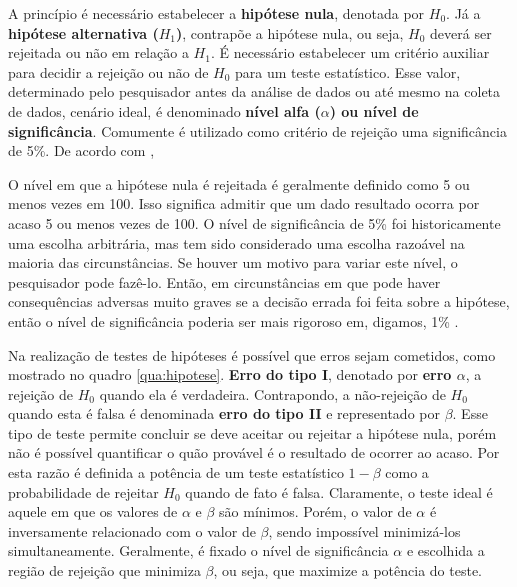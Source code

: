 A princípio é necessário estabelecer a \textbf{hipótese nula}, denotada por \textbf{$H_0$}. Já a \textbf{hipótese alternativa ($H_1$)}, contrapõe a hipótese nula, ou seja, $H_0$ deverá ser rejeitada ou não em relação a $H_1$. É necessário estabelecer um critério auxiliar para decidir a rejeição ou não de $H_0$ para um teste estatístico. Esse valor, determinado pelo pesquisador antes da análise de dados ou até mesmo na coleta de dados, cenário ideal, é denominado \textbf{nível alfa ($\alpha$) ou nível de significância}. Comumente é utilizado como critério de rejeição uma significância de 5\%. De acordo com , 

\begin{citacao}
O nível em que a hipótese nula é rejeitada é geralmente definido como 5 ou menos vezes em 100. Isso significa admitir que um dado resultado ocorra por acaso 5 ou menos vezes de 100.  O nível de significância de 5\% foi historicamente uma escolha arbitrária, mas tem sido considerado uma escolha razoável na maioria das circunstâncias. Se houver um motivo para variar este nível, o pesquisador pode  fazê-lo. Então, em circunstâncias em que pode haver consequências adversas muito graves se a decisão errada foi feita sobre a hipótese, então o nível de significância poderia ser mais rigoroso em, digamos, 1\% \cite[p.~151]{cramer2004sage}. 
\end{citacao}

Na realização de testes de hipóteses é possível que erros sejam cometidos, como mostrado no quadro \ref{qua:hipotese}. \textbf{Erro do tipo I}, denotado por \textbf{erro $\alpha$}, a rejeição de $H_0$ quando ela é verdadeira. Contrapondo, a não-rejeição de $H_0$ quando esta é falsa é denominada \textbf{erro do tipo II} e representado por \textbf{$\beta$}.  Esse tipo de teste permite concluir se deve aceitar ou rejeitar a hipótese nula, porém não é possível quantificar o quão provável é o resultado de ocorrer ao acaso. Por esta razão é definida a potência de um teste estatístico $1-\beta$ como a probabilidade de rejeitar $H_0$ quando de fato é falsa. Claramente, o teste ideal é aquele em que os valores de $\alpha$ e $\beta$ são mínimos. Porém, o valor de $\alpha$ é inversamente relacionado com o valor de $\beta$, sendo impossível minimizá-los simultaneamente. Geralmente, é fixado o nível de significância $\alpha$ e escolhida a região de rejeição que minimiza $\beta$, ou seja, que maximize a potência do teste. 


